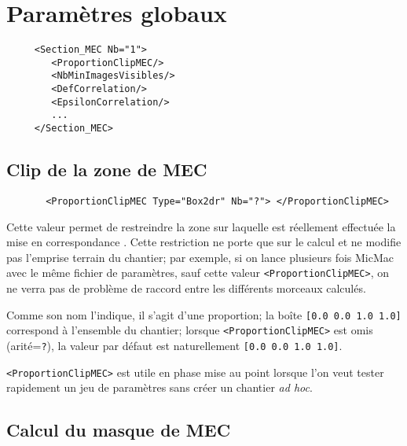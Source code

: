 
\section{Param\`etres globaux}

\label{TAG:MEC:GLOB}

\begin{verbatim}
     <Section_MEC Nb="1">
        <ProportionClipMEC/>
        <NbMinImagesVisibles/>
        <DefCorrelation/>
        <EpsilonCorrelation/>
        ...
     </Section_MEC>
\end{verbatim}



\subsection{Clip de la zone de MEC}

\begin{verbatim}
       <ProportionClipMEC Type="Box2dr" Nb="?"> </ProportionClipMEC>
\end{verbatim}

Cette valeur permet de restreindre la zone sur laquelle est
r\'eellement effectu\'ee la mise en correspondance . Cette
restriction ne porte que sur le calcul et ne
modifie pas l'emprise terrain du chantier; par exemple, si on lance
plusieurs fois MicMac  avec  le m\^eme fichier de
param\`etres, sauf cette valeur {\tt <ProportionClipMEC>},
on ne verra pas de probl\`eme de raccord entre les
diff\'erents morceaux calcul\'es.

Comme son nom l'indique, il s'agit d'une proportion; la bo\^ite
{\tt [0.0 0.0 1.0 1.0]} correspond \`a l'ensemble du chantier;
lorsque  {\tt <ProportionClipMEC>} est omis (arit\'e={\tt ?}),
la valeur par d\'efaut est naturellement {\tt [0.0 0.0 1.0 1.0]}.

{\tt <ProportionClipMEC>} est utile en phase mise au point
lorsque l'on veut tester rapidement un jeu de param\`etres
sans cr\'eer un chantier \emph{ad hoc}.



\subsection{Calcul du masque de MEC}

